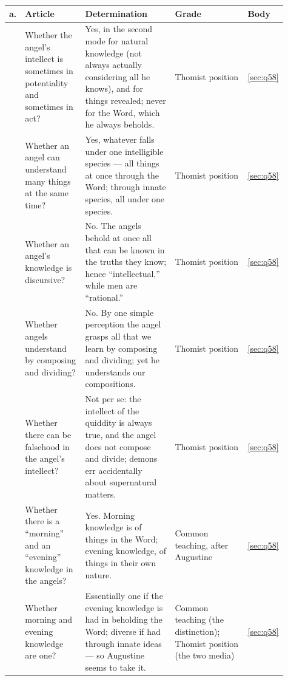 \begingroup\footnotesize
\begin{longtable}{>{\raggedright\arraybackslash}p{0.03\linewidth}>{\raggedright\arraybackslash}p{0.22\linewidth}>{\raggedright\arraybackslash}p{0.33\linewidth}>{\raggedright\arraybackslash}p{0.27\linewidth}>{\raggedright\arraybackslash}p{0.06\linewidth}}
\toprule
\textbf{a.} & \textbf{Article} & \textbf{Determination} & \textbf{Grade} & \textbf{Body}\\
\midrule
\endhead
1 & Whether the angel's intellect is sometimes in potentiality and sometimes in act? & Yes, in the second mode for natural knowledge (not always actually considering all he knows), and for things revealed; never for the Word, which he always beholds. & Thomist position & \ref{sec:q58}\\
2 & Whether an angel can understand many things at the same time? & Yes, whatever falls under one intelligible species --- all things at once through the Word; through innate species, all under one species. & Thomist position & \ref{sec:q58}\\
3 & Whether an angel's knowledge is discursive? & No. The angels behold at once all that can be known in the truths they know; hence ``intellectual,'' while men are ``rational.'' & Thomist position & \ref{sec:q58}\\
4 & Whether angels understand by composing and dividing? & No. By one simple perception the angel grasps all that we learn by composing and dividing; yet he understands our compositions. & Thomist position & \ref{sec:q58}\\
5 & Whether there can be falsehood in the angel's intellect? & Not per se: the intellect of the quiddity is always true, and the angel does not compose and divide; demons err accidentally about supernatural matters. & Thomist position & \ref{sec:q58}\\
6 & Whether there is a ``morning'' and an ``evening'' knowledge in the angels? & Yes. Morning knowledge is of things in the Word; evening knowledge, of things in their own nature. & Common teaching, after Augustine & \ref{sec:q58}\\
7 & Whether morning and evening knowledge are one? & Essentially one if the evening knowledge is had in beholding the Word; diverse if had through innate ideas --- so Augustine seems to take it. & Common teaching (the distinction); Thomist position (the two media) & \ref{sec:q58}\\
\bottomrule
\end{longtable}
\endgroup

